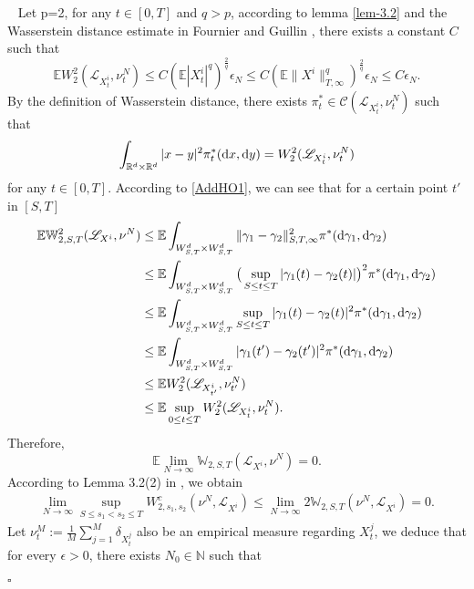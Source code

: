 \documentclass[12pt]{article}
\def\L{\mathscr{L}}
\def\R{\mathbb R}
\def\N{\mathbb N}
\def\d{\text{\rm{d}}}
\def\E{\mathbb E}
\def\W{\mathbb{W}}
\newenvironment{proof}{{\noindent\it Proof.}\ }{\hfill $\square$\par}
\numberwithin{equation}{section}
\begin{document}
		\begin{proof}
			Let p=2, for any $t\in [0,T]$ and $q>p$, according to lemma \ref{lem-3.2} and the Wasserstein distance estimate in Fournier and Guillin \cite[Theorem 1]{Fou},  there exists a constant $C$ such that
			\begin{equation}
				\E W^2_2(\L_{X^i_t},\nu_t^N)\leq C(\E|X^i_t|^q)^{\frac{2}{q}}\epsilon_N\leq C(\E\|X^i\|^q_{T,\infty})^{\frac{2}{q}}\epsilon_N\leq C\epsilon_N.
			\end{equation}
			By the definition of Wasserstein distance, there exists $\pi_t^*\in \mathscr C(\L_{X^i_t},\nu_t^N)$ such that
			\begin{equation}
				\int_{\R^d \times \R^d}|x-y|^2\pi_t^*(\d x,\d y)=W^2_2(\L_{X^i_t},\nu_t^N)
			\end{equation}
			for any $t\in [0,T]$. According to \eqref{AddHO1},
			we can see that for a certain point $t'$ in $[S,T]$
			\begin{align*}
				\E\W^2_{2,S,T}(\L_{X^i},\nu^N)
				&\leq \E\int_{W^d_{S,T}\times W^d_{S,T}}\|\gamma_1-\gamma_2\|^2_{S,T,\infty}\pi^*(\d \gamma_1,\d \gamma_2)\\
				&\leq \E\int_{W^d_{S,T}\times W^d_{S,T}}\big(\sup_{S\leq t \leq T}|\gamma_1(t)-\gamma_2(t)|\big)^2\pi^*(\d \gamma_1,\d \gamma_2)\\
				&\leq \E\int_{W^d_{S,T}\times W^d_{S,T}}\sup_{S\leq t \leq T}|\gamma_1(t)-\gamma_2(t)|^2\pi^*(\d \gamma_1,\d \gamma_2)\\
				&\leq \E\int_{W^d_{S,T}\times W^d_{S,T}}|\gamma_1(t')-\gamma_2(t')|^2\pi^*(\d \gamma_1,\d \gamma_2)\\
				&\leq\E W^2_2(\L_{X^i_{t'}},\nu_{t'}^N)\\
				&\leq \E\sup_{0\leq t\leq T}W^2_2(\L_{X^i_{t}},\nu_{t}^N).
			\end{align*}
			Therefore,
			\begin{equation}
				\E\lim_{N\to \infty}\W_{2,S,T}(\L_{X^i},\nu^N)=0.
			\end{equation}
			According to Lemma 3.2(2) in \cite{fan}, we obtain
			\begin{align*}
				\lim_{N\to \infty}\sup_{S\leq s_1<s_2\leq T}W^c_{2,s_1,s_2}(\nu^N,\L_{X^i})\leq \lim_{N\to \infty}2\W_{2,S,T}(\nu^N,\L_{X^i})=0.
			\end{align*}
			Let $\nu^M_t:=\frac{1}{M}\sum\limits_{j=1}^M\delta_{{X}^j_{t}}$ also be an empirical measure regarding $X^j_t$, we deduce that for every $\epsilon > 0$, there
			exists $N_0 \in \N$ such that
			\begin{align*}

\end{align*}
\end{proof}
\end{document}
